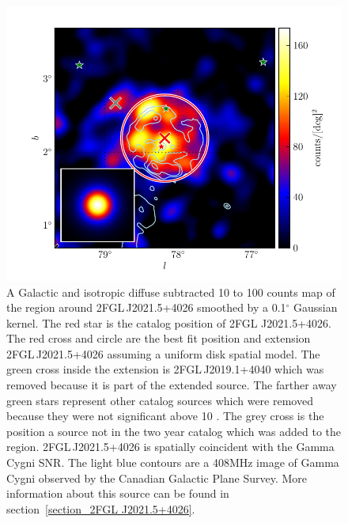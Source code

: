 \documentclass[12pt,preprint]{aastex}
\newcommand{\gev}{\text{GeV}\xspace}
\renewcommand{\deg}{\ensuremath{^\circ}\xspace}
\begin{document}
\begin{figure}
  \begin{center}
    \includegraphics[type=pdf,ext=.pdf,read=.pdf]{source_plots/source_Gamma_Cygni}
  \end{center}
  \caption{A Galactic and isotropic diffuse subtracted 10 \gev to 100
  \gev counts map of the region around 2FGL\,J2021.5+4026 smoothed by a
  0.1\deg Gaussian kernel. The red star is the catalog position of 2FGL
  J2021.5+4026.  The red cross and circle are the best fit position and
  extension 2FGL\,J2021.5+4026 assuming a uniform disk spatial model.
  The green cross inside the extension is 2FGL\,J2019.1+4040 which
  was removed because it is part of the extended source.  The farther
  away green stars represent other catalog sources which were removed
  because they were not significant above 10 \gev.  The grey cross is
  the position a source not in the two year catalog which was added
  to the region. 2FGL\,J2021.5+4026 is spatially coincident with the
  Gamma Cygni SNR.  The light blue contours are a 408MHz image of Gamma Cygni
  observed by the Canadian Galactic Plane Survey.  More information about
  this source can be found in section~\ref{section_2FGL J2021.5+4026}.
  }\label{1FGL_J2020.0+4049}
\end{figure}
\end{document}
